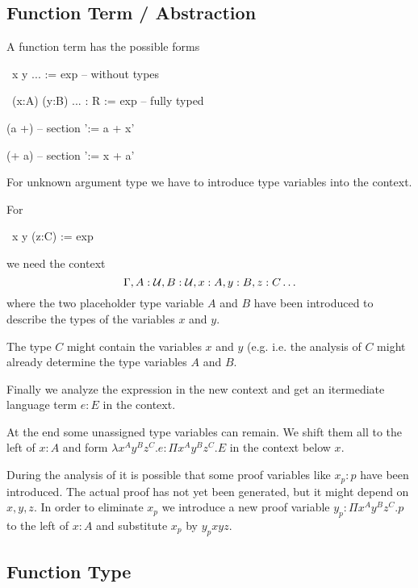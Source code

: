 \subsection{Function Term / Abstraction}

A function term has the possible forms

\begin{alba}
  \ x y ... := exp                     -- without types

  \ (x:A) (y:B) ... : R := exp         -- fully typed

  (a +)                                -- section '\x := a + x'

  (+ a)                                -- section '\x := x + a'
\end{alba}


For unknown argument type we have to introduce type variables into the context.

For
\begin{alba}
  \ x y (z:C) := exp
\end{alba}
%
we need the context
$$
    \Gamma, A:{\cal{U}}, B:{\cal{U}}, x:A, y:B, z:C \ldots
$$
%
where the two placeholder type variable $A$ and $B$ have been introduced to
describe the types of the variables $x$ and $y$.

The type $C$ might contain the variables $x$ and $y$ (e.g. 
i.e. the analysis of $C$ might already determine the type variables $A$ and
$B$.

Finally we analyze the expression  in the new context and get an
itermediate language term $e:E$ in the context.

At the end some unassigned type variables can remain. We shift them all to the
left of $x:A$ and form $\lambda x^A y^B z^C . e : \Pi x^A y^B z^C . E$ in the
context below $x$.

During the analysis of  it is possible that some proof variables
like $x_p:p$ have been introduced. The actual proof has not yet been
generated, but it might depend on $x,y,z$. In order to eliminate $x_p$ we
introduce a new proof variable $y_p:\Pi x^A y^B z^C . p$ to the left of $x:A$
and substitute $x_p$ by $y_p x y z$.








\subsection{Function Type}


